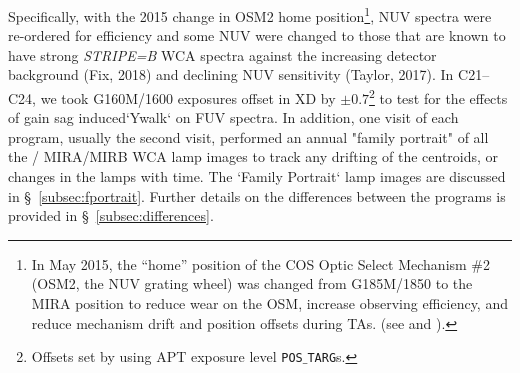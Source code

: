 Specifically, with the 2015 change in OSM2 home position\footnote{In May 2015, the ``home'' position of the COS Optic Select Mechanism \#2 (OSM2, the NUV grating wheel) was changed from G185M/1850 to the MIRA position to reduce wear on the OSM, increase observing efficiency, and reduce mechanism drift and position offsets during  TAs. (see  and ).}, NUV spectra were re-ordered for efficiency and some NUV \cenwaves{} were changed to those
that are known to have strong \textit{STRIPE=B} WCA spectra against the increasing detector background (Fix, 2018) and declining NUV sensitivity (Taylor, 2017).
In C21--C24, we took G160M/1600 exposures offset in XD by $\pm 0.7$\arcsec\footnote{Offsets set by using APT exposure level \texttt{POS$\_$TARG}s.} to test for the effects of gain sag induced`Ywalk` on FUV spectra.
In addition, one visit of each program, usually the second visit, performed an annual "family portrait"  of all the \plampone{}/\plamptwo{} MIRA/MIRB WCA lamp images to track any drifting of the centroids, or changes in the lamps with time.
The `Family Portrait` lamp images are discussed in \S~\ref{subsec:fportrait}.
Further details on the differences between the programs is provided in \S~\ref{subsec:differences}.
